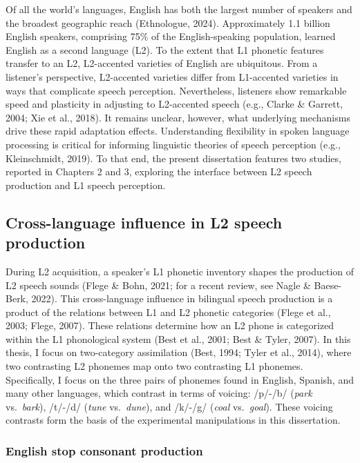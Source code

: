 \documentclass[
  12pt,
  twoside]{article}
\begin{document}
Of all the world's languages, English has both the largest number of speakers and the broadest geographic reach (Ethnologue, 2024).
Approximately 1.1 billion English speakers, comprising 75\% of the English-speaking population, learned English as a second language (L2).
To the extent that L1 phonetic features transfer to an L2, L2-accented varieties of English are ubiquitous.
From a listener's perspective, L2-accented varieties differ from L1-accented varieties in ways that complicate speech perception.
Nevertheless, listeners show remarkable speed and plasticity in adjusting to L2-accented speech (e.g., Clarke \& Garrett, 2004; Xie et al., 2018).
It remains unclear, however, what underlying mechanisms drive these rapid adaptation effects.
Understanding flexibility in spoken language processing is critical for informing linguistic theories of speech perception (e.g., Kleinschmidt, 2019).
To that end, the present dissertation features two studies, reported in Chapters 2 and 3, exploring the interface between L2 speech production and L1 speech perception.

\hypertarget{cross-language-influence-in-l2-speech-production}{%
\subsection{Cross-language influence in L2 speech production}\label{cross-language-influence-in-l2-speech-production}}

During L2 acquisition, a speaker's L1 phonetic inventory shapes the production of L2 speech sounds (Flege \& Bohn, 2021; for a recent review, see Nagle \& Baese-Berk, 2022).
This cross-language influence in bilingual speech production is a product of the relations between L1 and L2 phonetic categories (Flege et al., 2003; Flege, 2007).
These relations determine how an L2 phone is categorized within the L1 phonological system (Best et al., 2001; Best \& Tyler, 2007).
In this thesis, I focus on two-category assimilation (Best, 1994; Tyler et al., 2014), where two contrasting L2 phonemes map onto two contrasting L1 phonemes.
Specifically, I focus on the three pairs of phonemes found in English, Spanish, and many other languages, which contrast in terms of voicing: /p/-/b/ (\emph{park} vs.~\emph{bark}), /t/-/d/ (\emph{tune} vs.~\emph{dune}), and /k/-/g/ (\emph{coal} vs.~\emph{goal}).
These voicing contrasts form the basis of the experimental manipulations in this dissertation.

\hypertarget{english-stop-consonant-production}{%
\subsubsection{English stop consonant production}\label{english-stop-consonant-production}}
\end{document}
